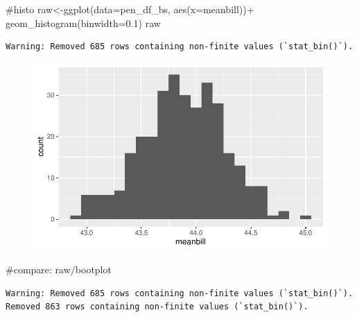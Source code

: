 \documentclass[
  letterpaper,
  DIV=11,
  numbers=noendperiod]{scrartcl}
\newenvironment{Shaded}{\begin{snugshade}}{\end{snugshade}}
\newcommand{\AttributeTok}[1]{\textcolor[rgb]{0.40,0.45,0.13}{#1}}
\newcommand{\CommentTok}[1]{\textcolor[rgb]{0.37,0.37,0.37}{#1}}
\newcommand{\FloatTok}[1]{\textcolor[rgb]{0.68,0.00,0.00}{#1}}
\newcommand{\FunctionTok}[1]{\textcolor[rgb]{0.28,0.35,0.67}{#1}}
\newcommand{\NormalTok}[1]{\textcolor[rgb]{0.00,0.23,0.31}{#1}}
\newcommand{\OtherTok}[1]{\textcolor[rgb]{0.00,0.23,0.31}{#1}}
\newcommand{\SpecialCharTok}[1]{\textcolor[rgb]{0.37,0.37,0.37}{#1}}
\begin{document}
\begin{Shaded}
\begin{Highlighting}[]
\CommentTok{\#histo}
\NormalTok{raw}\OtherTok{\textless{}{-}}\FunctionTok{ggplot}\NormalTok{(}\AttributeTok{data=}\NormalTok{pen\_df\_bs, }\FunctionTok{aes}\NormalTok{(}\AttributeTok{x=}\NormalTok{meanbill))}\SpecialCharTok{+}
  \FunctionTok{geom\_histogram}\NormalTok{(}\AttributeTok{binwidth=}\FloatTok{0.1}\NormalTok{)}
\NormalTok{raw}
\end{Highlighting}
\end{Shaded}

\begin{verbatim}
Warning: Removed 685 rows containing non-finite values (`stat_bin()`).
\end{verbatim}

\begin{figure}[H]

{\centering \includegraphics{CIs_files/figure-pdf/unnamed-chunk-7-2.pdf}

}

\end{figure}

\begin{Shaded}
\begin{Highlighting}[]
\CommentTok{\#compare:}
\NormalTok{raw}\SpecialCharTok{/}\NormalTok{bootplot}
\end{Highlighting}
\end{Shaded}

\begin{verbatim}
Warning: Removed 685 rows containing non-finite values (`stat_bin()`).
Removed 863 rows containing non-finite values (`stat_bin()`).
\end{verbatim}
\end{document}
